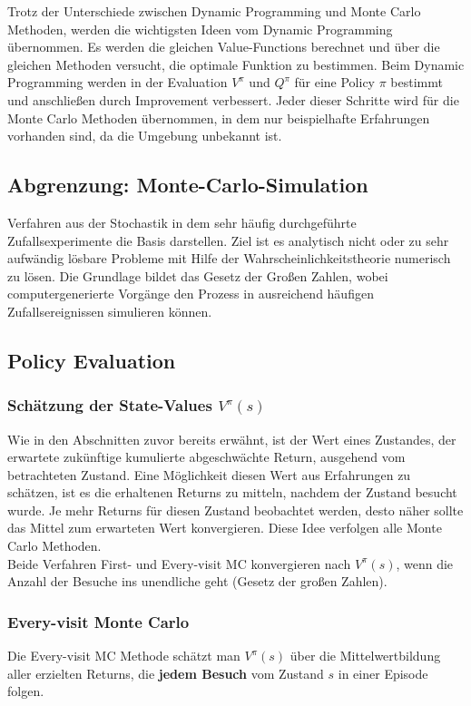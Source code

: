\documentclass[10pt]{scrartcl}
\begin{document}
Trotz der Unterschiede zwischen Dynamic Programming und Monte Carlo Methoden, werden die wichtigsten Ideen vom Dynamic Programming übernommen. Es werden die gleichen Value-Functions berechnet und über die gleichen Methoden versucht, die optimale Funktion zu bestimmen. Beim Dynamic Programming werden in der Evaluation $V^{\pi}$ und $Q^{\pi}$ für eine Policy $\pi$ bestimmt und anschließen durch Improvement verbessert. Jeder dieser Schritte wird für die Monte Carlo Methoden übernommen, in dem nur beispielhafte Erfahrungen vorhanden sind, da die Umgebung unbekannt ist.

\subsection{Abgrenzung: Monte-Carlo-Simulation}
Verfahren aus der Stochastik in dem sehr häufig durchgeführte Zufallsexperimente die Basis darstellen. Ziel ist es analytisch nicht oder zu sehr aufwändig lösbare Probleme mit Hilfe der Wahrscheinlichkeitstheorie numerisch zu lösen. Die Grundlage bildet das Gesetz der Großen Zahlen, wobei computergenerierte Vorgänge den Prozess in ausreichend häufigen Zufallsereignissen simulieren können.

\subsection{Policy Evaluation}
\subsubsection{Schätzung der State-Values $V^{\pi}(s)$}
Wie in den Abschnitten zuvor bereits erwähnt, ist der Wert eines Zustandes, der erwartete zukünftige kumulierte abgeschwächte Return, ausgehend vom betrachteten Zustand. Eine Möglichkeit diesen Wert aus Erfahrungen zu schätzen, ist es die erhaltenen Returns zu mitteln, nachdem der Zustand besucht wurde. Je mehr Returns für diesen Zustand beobachtet werden, desto näher sollte das Mittel zum erwarteten Wert konvergieren. Diese Idee verfolgen alle Monte Carlo Methoden.\\
Beide Verfahren First- und Every-visit MC konvergieren nach $V^{\pi}(s)$, wenn die Anzahl der Besuche ins unendliche geht (Gesetz der großen Zahlen).

\subsubsection{Every-visit Monte Carlo}
Die Every-visit MC Methode schätzt man $V^{\pi}(s)$ über die Mittelwertbildung aller erzielten Returns, die \textbf{jedem Besuch} vom Zustand $s$ in einer Episode folgen.
\end{document}
